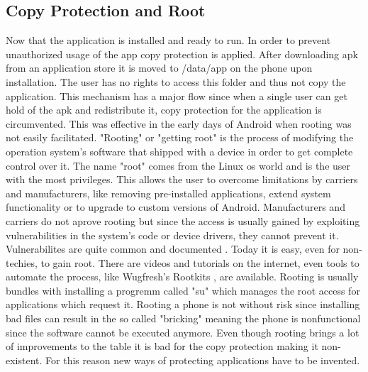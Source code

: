 \subsection{Copy Protection and Root} \label{subsection:android-copyroot}
Now that the application is installed and ready to run.
In order to prevent unauthorized usage of the app copy protection is applied.
After downloading \gls{apk} from an application store it is moved to /data/app on the phone upon installation.
The user has no rights to access this folder and thus not copy the application.
This mechanism has a major flow since when a single user can get hold of the \gls{apk} and redistribute it, copy protection for the application is circumvented.
This was effective in the early days of Android when rooting was not easily facilitated.
\newline
"Rooting" or "getting root" is the process of modifying the operation system's software that shipped with a device in order to get complete control over it.
The name "root" comes from the Linux \gls{os} world and is the user with the most privileges.
This allows the user to overcome limitations by carriers and manufacturers, like removing pre-installed applications, extend system functionality or to upgrade to custom versions of Android.
Manufacturers and carriers do not aprove rooting but since the access is usually gained by exploiting vulnerabilities in the system's code or device drivers, they cannot prevent it.
Vulnerabilites are quite common and documented \cite{androidVulnerabilities}.
Today it is easy, even for non-techies, to gain root.
There are videos and tutorials on the internet, even tools to automate the process, like Wugfresh's Rootkits \cite{wugfresh}, are available.
Rooting is usually bundles with installing a progremm called "su" which manages the root access for applications which request it.
Rooting a phone is not without risk since installing bad files can result in the so called "bricking" meaning the phone is nonfunctional since the software cannot be executed anymore.\cite{androidpoliceRoot}
\newline
Even though rooting brings a lot of improvements to the table it is bad for the copy protection making it non-existent. For this reason new ways of protecting applications have to be invented.
